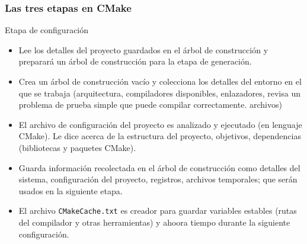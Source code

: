 \begin{frame}
	\frametitle{Las tres etapas en CMake}
	
	\begin{block}{Etapa de configuración}
		\begin{itemize}
			\item

			Lee los detalles del proyecto guardados en el árbol de construcción
			y preparará un árbol de construcción para la etapa de generación.
			
			\item

			Crea un árbol de construcción vacío y colecciona los detalles del entorno
			en el que se trabaja (arquitectura, compiladores disponibles, enlazadores,
			revisa un problema de prueba simple que puede compilar correctamente.
			archivos)
			
			
						\item

El archivo de configuración del proyecto es analizado y ejecutado (en lenguaje CMake).
Le dice acerca de la estructura del proyecto, objetivos, dependencias (bibliotecas y paquetes CMake).
			
						\item
			
						Guarda información recolectada en el árbol de construcción
						como detalles del sistema, configuración del proyecto, registros,
						archivos temporales; que serán usados en la siguiente etapa.

						\item

						El archivo \lstinline{CMakeCache.txt} es creador para guardar
						variables estables (rutas del compilador y otras herramientas)
						y ahoora tiempo durante la siguiente configuración.
					\end{itemize}
	\end{block}
\end{frame}

